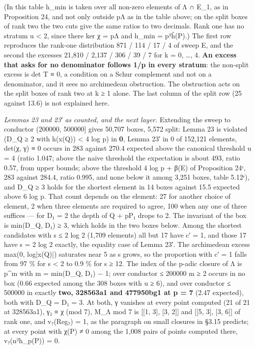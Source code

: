 \documentclass[11pt,a4paper]{article}
\theoremstyle{named}
\begin{document}
(In this table h\_min is taken over all non-zero elements of Λ ∩ E\_1, as in Proposition 24, and not only outside pΛ as in the table above; on the split boxes of rank two the two cuts give the same ratios to two decimals. Rank one has no stratum u \textless{} 2, since there ker χ = pΛ and h\_min = p²ĥ(P).) The first row reproduces the rank-one distribution 871 / 114 / 17 / 4 of sweep E, and the second the excesses 21,810 / 2,137 / 306 / 39 / 7 for k = 0, …, 4. \textbf{An excess that asks for no denominator follows 1/p in every stratum}: the non-split excess is det T ≡ 0, a condition on a Schur complement and not on a denominator, and it sees no archimedean obstruction. The obstruction acts on the split boxes of rank two at k ≥ 1 alone. The last column of the split row (25 against 13.6) is not explained here.

\textit{Lemmas 23 and 23′ as counted, and the next layer.} Extending the sweep to conductor (200000, 500000] gives 50,707 boxes, 5,572 split: Lemma 23 is violated (D\_Q ≥ 2 with h(x(Q)) \textless{} 4 log p) in \textbf{0}, Lemma 23′ in 0 of 152,121 elements, det(χ, γ) ≡ 0 occurs in 283 against 270.4 expected above the canonical threshold u = 4 (ratio 1.047; above the naive threshold the expectation is about 493, ratio 0.57, from upper bounds; above the threshold 4 log p + β(E) of Proposition 24ᶜ, 283 against 284.4, ratio 0.995, and none below it among 3,251 boxes, table 5.12ᶜ), and D\_Q ≥ 3 holds for the shortest element in 14 boxes against 15.5 expected above 6 log p. That count depends on the element: 27 for another choice of element, 2 when three elements are required to agree, 100 when any one of three suffices — for D₁ = 2 the depth of Q + pP₁ drops to 2. The invariant of the box is min(D\_Q, D₁) ≥ 3, which holds in the two boxes below. Among the shortest candidates with s ≤ 2 log 2 (1,709 elements) all but 17 have c′ = 1, and those 17 have s = 2 log 2 exactly, the equality case of Lemma 23′. The archimedean excess max(0, log|x(Q)|) saturates near 5 as s grows, so the proportion with c′ = 1 falls from 97 \% for s \textless{} 2 to 0.9 \% for s ≥ 12. The index of the p-adic closure of Λ is p\textasciicircum{}m with m = min(D\_Q, D₁) − 1; over conductor ≤ 200000 m ≥ 2 occurs in no box (0.66 expected among the 308 boxes with u ≥ 6), and over conductor ≤ 500000 in exactly \textbf{two, 328563a1 and 477950bg1 at p = 7} (2.47 expected), both with D\_Q = D₁ = 3. At both, γ vanishes at every point computed (21 of 21 at 328563a1), γ₂ ≡ χ (mod 7), M\_Λ mod 7 is [[1, 3], [3, 2]] and [[5, 3], [3, 6]] of rank one, and v₇(Reg₇) = 1, as the paragraph on small closures in §3.15 predicts; at every point with χ(P) ≠ 0 among the 1,008 pairs of points computed there, v₇(n²h\_p(P)) = 0.
\end{document}
